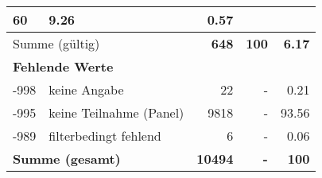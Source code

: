 \begin{longtable}{lXrrr}
       \num{60} &
       \num[round-mode=places,round-precision=2]{9,26} &
         \num[round-mode=places,round-precision=2]{0,57} \\
     \midrule
     \multicolumn{2}{l}{Summe (gültig)} &
       \textbf{\num{648}} &
     \textbf{100} &
       \textbf{\num[round-mode=places,round-precision=2]{6,17}} \\
     \multicolumn{5}{l}{\textbf{Fehlende Werte}}\\
       -998 &
       keine Angabe &
         \num{22} &
        - &
         \num[round-mode=places,round-precision=2]{0,21} \\
       -995 &
       keine Teilnahme (Panel) &
         \num{9818} &
        - &
         \num[round-mode=places,round-precision=2]{93,56} \\
       -989 &
       filterbedingt fehlend &
         \num{6} &
        - &
         \num[round-mode=places,round-precision=2]{0,06} \\
     \midrule
     \multicolumn{2}{l}{\textbf{Summe (gesamt)}} &
          \textbf{\num{10494}} &
        \textbf{-} &
        \textbf{100} \\
     \bottomrule
     \end{longtable}
     
